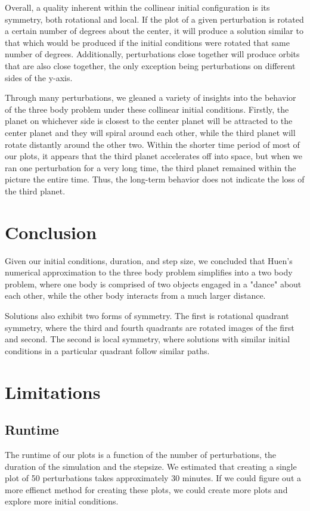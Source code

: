 \documentclass{article}
\begin{document}
Overall, a quality inherent within the collinear initial configuration is its symmetry, both rotational and local. If the plot of a given perturbation is rotated a certain number of degrees about the center, it will produce a solution similar to that which would be produced if the initial conditions were rotated that same number of degrees. Additionally, perturbations close together will produce orbits that are also close together, the only exception being perturbations on different sides of the y-axis. 

Through many perturbations, we gleaned a variety of insights into the behavior of the three body problem under these collinear initial conditions. Firstly, the planet on whichever side is closest to the center planet will be attracted to the center planet and they will spiral around each other, while the third planet will rotate distantly around the other two. Within the shorter time period of most of our plots, it appears that the third planet accelerates off into space, but when we ran one perturbation for a very long time, the third planet remained within the picture the entire time. Thus, the long-term behavior does not indicate the loss of the third planet. 

\section{Conclusion}
Given our initial conditions, duration, and step size, we concluded that Huen's numerical approximation to the three body problem simplifies into a two body problem, where one body is comprised of two objects engaged in a "dance" about each other, while the other body interacts from a much larger distance.

Solutions also exhibit two forms of symmetry. The first is rotational quadrant symmetry, where the third and fourth quadrants are rotated images of the first and second. The second is local symmetry, where solutions with similar initial conditions in a particular quadrant follow similar paths.

\section{Limitations}
\subsection{Runtime}
The runtime of our plots is a function of the number of perturbations, the duration of the simulation and the stepsize. We estimated that creating a single plot of 50 perturbations takes approximately 30 minutes. If we could figure out a more effienct method for creating these plots, we could create more plots and explore more initial conditions.
\end{document}
